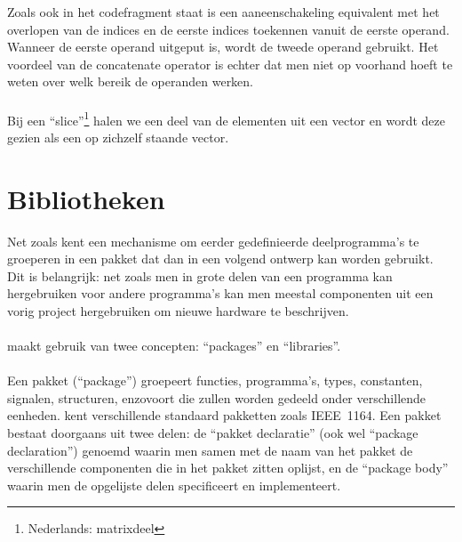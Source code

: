
Zoals ook in het codefragment staat is een aaneenschakeling equivalent met het overlopen van de indices en de eerste indices toekennen vanuit de eerste operand. Wanneer de eerste operand uitgeput is, wordt de tweede operand gebruikt. Het voordeel van de concatenate operator is echter dat men niet op voorhand hoeft te weten over welk bereik de operanden werken.

\paragraph{}
Bij een ``slice''\footnote{Nederlands: matrixdeel} halen we een deel van de elementen uit een vector en wordt deze gezien als een op zichzelf staande vector.


\section{Bibliotheken}
Net zoals \tjava{} kent \tvhdl{} een mechanisme om eerder gedefinieerde deelprogramma's te groeperen in een pakket dat dan in een volgend ontwerp kan worden gebruikt. Dit is belangrijk: net zoals men in \tjava{} grote delen van een programma kan hergebruiken voor andere programma's kan men meestal componenten uit een vorig project hergebruiken om nieuwe hardware te beschrijven.

\paragraph{}
\tvhdl{} maakt gebruik van twee concepten: ``packages'' en ``libraries''.

\paragraph{}
Een pakket (``package'') groepeert functies, programma's, types, constanten, signalen, structuren, enzovoort die zullen worden gedeeld onder verschillende eenheden. \tvhdl{} kent verschillende standaard pakketten zoals IEEE~1164. Een pakket bestaat doorgaans uit twee delen: de ``pakket declaratie'' (ook wel ``package declaration'') genoemd waarin men samen met de naam van het pakket de verschillende componenten die in het pakket zitten oplijst, en de ``package body'' waarin men de opgelijste delen specificeert en implementeert.

